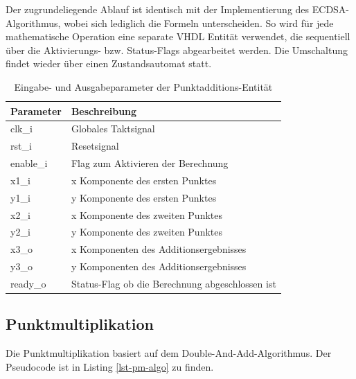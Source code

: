 Der zugrundeliegende Ablauf ist identisch mit der Implementierung des ECDSA-Algorithmus, wobei sich lediglich die Formeln unterscheiden. So wird für jede mathematische Operation eine separate VHDL Entität verwendet, die sequentiell über die Aktivierungs- bzw. Status-Flags abgearbeitet werden. Die Umschaltung findet wieder über einen Zustandsautomat statt. \\

\begin{table} [h]
	\centering 
	\begin{tabular}{ | p{3cm} | p{12cm} | }
		\hline
		\textbf{Parameter} & \textbf{Beschreibung}\\
		\hline
		clk\_i & Globales Taktsignal \\
		\hline
		rst\_i & Resetsignal \\
		\hline
		enable\_i & Flag zum Aktivieren der Berechnung \\
		\hline
		x1\_i & x Komponente des ersten Punktes \\
		\hline
		y1\_i & y Komponente des ersten Punktes \\
		\hline
		x2\_i & x Komponente des zweiten Punktes \\
		\hline
		y2\_i & y Komponente des zweiten Punktes \\
		\hline
		x3\_o & x Komponenten des Additionsergebnisses \\
		\hline
		y3\_o & y Komponenten des Additionsergebnisses \\
		\hline
		ready\_o & Status-Flag ob die Berechnung abgeschlossen ist  \\
		\hline
		\hline
	\end{tabular}
	\caption{Eingabe- und Ausgabeparameter der Punktadditions-Entität}
	\label{tab:vhdl-impl-eccadd-param}
\end{table}

\subsection{Punktmultiplikation}
Die Punktmultiplikation basiert auf dem Double-And-Add-Algorithmus. Der Pseudocode ist in Listing \ref{lst-pm-algo} zu finden. \\

